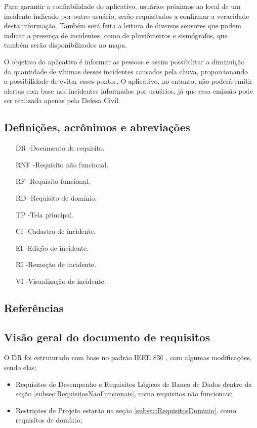 \documentclass[12pt]{article}
\begin{document}
Para garantir a confiabilidade do aplicativo, usuários próximos ao local de um incidente indicado por outro usuário, serão requisitados a confirmar a veracidade desta informação. Também será feita a leitura de diversos sensores que podem indicar a presença de incidentes, como de pluviômetros e sismógrafos, que também serão disponibilizados no mapa.

O objetivo do aplicativo é informar as pessoas e assim possibilitar a diminuição da quantidade de vítimas desses incidentes causados pela chuva, proporcionando a possibilidade de evitar esses pontos. O aplicativo, no entanto, não poderá emitir alertas com base nos incidentes informados por usuários, já que essa emissão pode ser realizada apenas pela Defesa Civil.

\subsection{Definições, acrônimos e abreviações}\label{subsec:Defs}
\begin{itemize}
    \item [DR]-Documento de requisito.
    \item [RNF]-Requisito não funcional.
    \item [RF]-Requisito funcional.
    \item [RD]-Requisito de domínio.
    \item [TP]-Tela principal.
    \item [CI]-Cadastro de incidente.
    \item [EI]-Edição de incidente.
    \item [RI]-Remoção de incidente.
    \item [VI]-Visualização de incidente.
\end{itemize}

\subsection{Referências} 

\subsection{Visão geral do documento de requisitos}
O DR foi estruturado com base no padrão IEEE 830 \cite{ieee1994ieee}, com algumas modificações, sendo elas:
\begin{itemize}
    \item Requisitos de Desempenho e Requisitos Lógicos de Banco de Dados dentro da seção \ref{subsec:RequisitosNaoFuncionais}, como requisitos não funcionais;
    \item Restrições de Projeto estarão na seção \ref{subsec:RequisitosDominio}, como requisitos de domínio;
\end{itemize}
\end{document}
